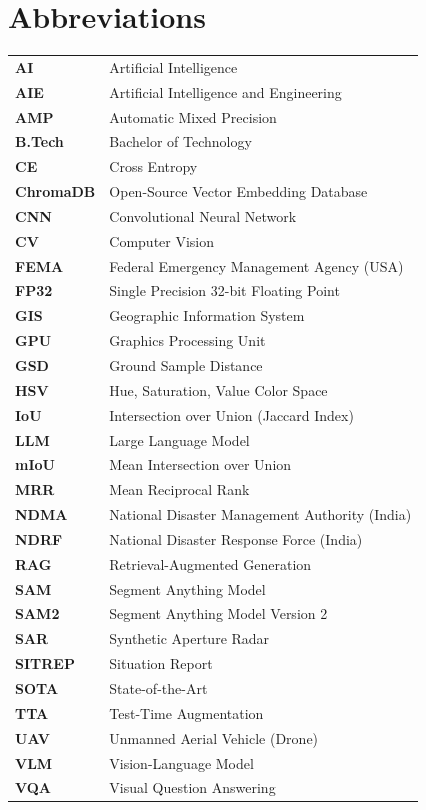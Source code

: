 \documentclass[a4paper, 12pt]{report}
\theoremstyle{definition}
\begin{document}
	\section*{{\huge Abbreviations}\hfill} 
	\vspace{0.8cm}
	\begin{longtable}{ll}
		\textbf{AI} & Artificial Intelligence \\
		\textbf{AIE} & Artificial Intelligence and Engineering \\
		\textbf{AMP} & Automatic Mixed Precision \\
		\textbf{B.Tech} & Bachelor of Technology \\
		\textbf{CE} & Cross Entropy \\
		\textbf{ChromaDB} & Open-Source Vector Embedding Database \\
		\textbf{CNN} & Convolutional Neural Network \\
		\textbf{CV} & Computer Vision \\
		\textbf{FEMA} & Federal Emergency Management Agency (USA) \\
		\textbf{FP32} & Single Precision 32-bit Floating Point \\
		\textbf{GIS} & Geographic Information System \\
		\textbf{GPU} & Graphics Processing Unit \\
		\textbf{GSD} & Ground Sample Distance \\
		\textbf{HSV} & Hue, Saturation, Value Color Space \\
		\textbf{IoU} & Intersection over Union (Jaccard Index) \\
		\textbf{LLM} & Large Language Model \\
		\textbf{mIoU} & Mean Intersection over Union \\
		\textbf{MRR} & Mean Reciprocal Rank \\
		\textbf{NDMA} & National Disaster Management Authority (India) \\
		\textbf{NDRF} & National Disaster Response Force (India) \\
		\textbf{RAG} & Retrieval-Augmented Generation \\
		\textbf{SAM} & Segment Anything Model \\
		\textbf{SAM2} & Segment Anything Model Version 2 \\
		\textbf{SAR} & Synthetic Aperture Radar \\
		\textbf{SITREP} & Situation Report \\
		\textbf{SOTA} & State-of-the-Art \\
		\textbf{TTA} & Test-Time Augmentation \\
		\textbf{UAV} & Unmanned Aerial Vehicle (Drone) \\
		\textbf{VLM} & Vision-Language Model \\
		\textbf{VQA} & Visual Question Answering \\
	\end{longtable}
\end{document}
